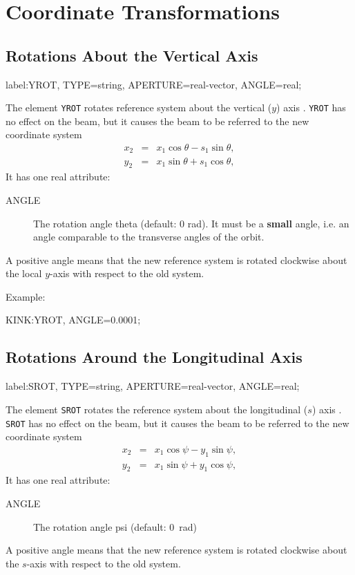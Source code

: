 \section{Coordinate Transformations}
\label{sec:rotation}

\subsection{Rotations About the Vertical Axis}
\label{sec:yrot}
\begin{example}
label:YROT, TYPE=string, APERTURE=real-vector,
      ANGLE=real;
\end{example}
The element \texttt{YROT} rotates reference system
about the vertical ($y$) axis .
\texttt{YROT} has no effect on the beam,
but it causes the beam to be referred to the new coordinate system
\[\begin{array}{lcl}
  x_2&=&x_1\cos\theta-s_1\sin\theta, \\
  y_2&=&x_1\sin\theta+s_1\cos\theta,
\end{array}\]
It has one real attribute:
\begin{description}
\item[ANGLE]
  The rotation angle theta (default: 0 rad).
  It must be a \textbf{small} angle,
  i.e. an angle comparable to the transverse angles of the orbit.
\end{description}
A positive angle means that the new reference system is rotated
clockwise about the local $y$-axis with respect to the old system.

\noindent Example:
\begin{example}
KINK:YROT, ANGLE=0.0001;
\end{example}

\subsection{Rotations Around the Longitudinal Axis}
\label{sec:srot}
\begin{example}
label:SROT, TYPE=string, APERTURE=real-vector,
      ANGLE=real;
\end{example}
The element \texttt{SROT} rotates the reference system
about the longitudinal ($s$) axis .
\texttt{SROT} has no effect on the beam,
but it causes the beam to be referred to the new coordinate system
\[\begin{array}{lcl}
  x_2&=&x_1\cos\psi-y_1\sin\psi, \\
  y_2&=&x_1\sin\psi+y_1\cos\psi,
\end{array}\]
It has one real attribute:
\begin{description}
\item[ANGLE]
  The rotation angle psi (default: 0~rad)
\end{description}
A positive angle means that the new reference system is rotated clockwise
about the $s$-axis with respect to the old system.

